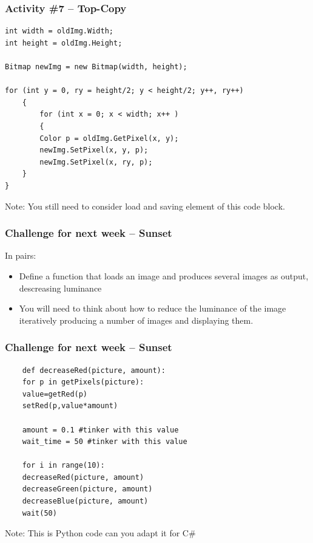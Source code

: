 \begin{frame}[fragile]
	\frametitle{Activity \#7 -- Top-Copy}
	
	\begin{lstlisting}
int width = oldImg.Width;
int height = oldImg.Height;

Bitmap newImg = new Bitmap(width, height);

for (int y = 0, ry = height/2; y < height/2; y++, ry++)
	{
		for (int x = 0; x < width; x++ )
		{
		Color p = oldImg.GetPixel(x, y);
		newImg.SetPixel(x, y, p);
		newImg.SetPixel(x, ry, p);    
	}
}	
	\end{lstlisting}
	
	Note: You still need to consider load and saving element of this code block.
	
\end{frame}
\begin{frame}
	\frametitle{Challenge for next week -- Sunset}
	
	In pairs:
	
	\vspace{2em}
	
	\begin{itemize}
		\item Define a function that loads an image and produces several images as output, descreasing luminance
		\item You will need to think about how to reduce the luminance of the image iteratively producing a number of images and displaying them.
	\end{itemize}
\end{frame}

\begin{frame}[fragile]
	\frametitle{Challenge for next week -- Sunset}
	\begin{lstlisting}
	def decreaseRed(picture, amount):
	for p in getPixels(picture):
	value=getRed(p)
	setRed(p,value*amount)
	
	amount = 0.1 #tinker with this value
	wait_time = 50 #tinker with this value    
	
	for i in range(10):
	decreaseRed(picture, amount)
	decreaseGreen(picture, amount)
	decreaseBlue(picture, amount)
	wait(50)
	\end{lstlisting}
	Note: This is Python code can you adapt it for C\#
	
\end{frame}


